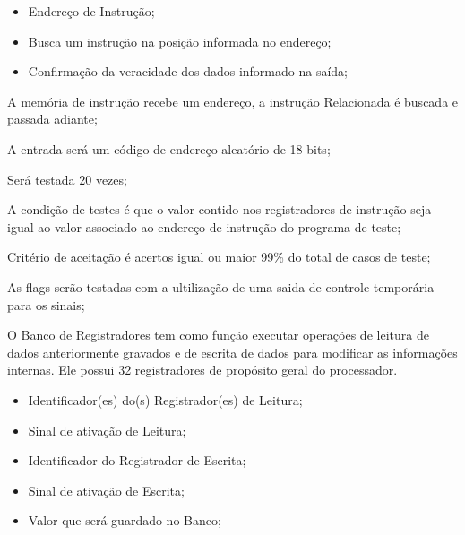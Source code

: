\documentclass{article}
\begin{document}
  	\begin{itemize}
     \item Endereço de Instrução;
     \end{itemize}
    
  \actions
  \begin{itemize}
     \item Busca um instrução na posição informada no endereço;
    \end{itemize}
  
  \results
  	\begin{itemize}
     \item Confirmação da veracidade dos dados informado na saída;
    \end{itemize}
  
  \begin{mainflow}
    \item A memória de instrução recebe um endereço, a instrução
Relacionada é buscada e passada adiante;
    \item A entrada será um código de endereço aleatório  de 18 bits;
    
    \item Será testada 20 vezes;
    \item A condição de testes é que o valor contido nos registradores de instrução seja igual ao valor associado ao endereço de instrução do programa de teste;
    
    \item Critério de aceitação é acertos igual ou maior 99\% do total de casos de teste;
    \item As flags serão testadas com a ultilização de uma saida de controle temporária para os sinais;
  \end{mainflow}

O Banco de Registradores tem como função executar operações de 
leitura de dados anteriormente gravados e de escrita de dados para modificar as informações internas. Ele possui 32 registradores de propósito geral do processador. 
  
  	\begin{itemize}
     \item Identificador(es) do(s) Registrador(es) de Leitura;
     \item Sinal de ativação de Leitura;
     \item Identificador do Registrador de Escrita;
     \item Sinal de ativação de Escrita;
     \item Valor que será guardado no Banco;
     \end{itemize}
    
\end{document}
